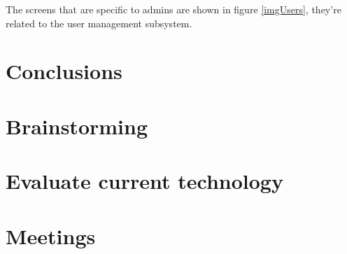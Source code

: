 \documentclass{report}
\begin{document}
The screens that are specific to admins are shown in figure \ref{imgUsers}, they're related to the user management subsystem.

\chapter{Conclusions}


\appendix

\chapter{Brainstorming}




\chapter{Evaluate current technology}

\chapter{Meetings}


\end{document}
